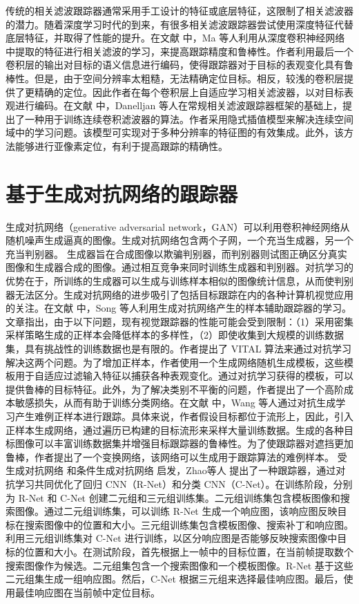 传统的相关滤波跟踪器通常采用手工设计的特征或底层特征，这限制了相关滤波器的潜力。随着深度学习时代的到来，有很多相关滤波跟踪器尝试使用深度特征代替底层特征，并取得了性能的提升。在文献 \cite{CF2} 中，Ma 等人利用从深度卷积神经网络中提取的特征进行相关滤波的学习，来提高跟踪精度和鲁棒性。作者利用最后一个卷积层的输出对目标的语义信息进行编码，使得跟踪器对于目标的表观变化具有鲁棒性。但是，由于空间分辨率太粗糙，无法精确定位目标。相反，较浅的卷积层提供了更精确的定位。因此作者在每个卷积层上自适应学习相关滤波器，以对目标表观进行编码。在文献 \cite{danelljan2016beyond} 中，Danelljan 等人在常规相关滤波跟踪器框架的基础上，提出了一种用于训练连续卷积滤波器的算法。作者采用隐式插值模型来解决连续空间域中的学习问题。该模型可实现对于多种分辨率的特征图的有效集成。此外，该方法能够进行亚像素定位，有利于提高跟踪的精确性。
\section{基于生成对抗网络的跟踪器}
生成对抗网络（generative adversarial network，GAN）可以利用卷积神经网络从随机噪声生成逼真的图像。生成对抗网络包含两个子网，一个充当生成器，另一个充当判别器。 生成器旨在合成图像以欺骗判别器，而判别器则试图正确区分真实图像和生成器合成的图像。通过相互竞争来同时训练生成器和判别器。对抗学习的优势在于，所训练的生成器可以生成与训练样本相似的图像统计信息，从而使判别器无法区分。生成对抗网络的进步吸引了包括目标跟踪在内的各种计算机视觉应用的关注。在文献 \cite{VITAL} 中，Song 等人利用生成对抗网络产生的样本辅助跟踪器的学习。文章指出，由于以下问题，现有视觉跟踪器的性能可能会受到限制：（1）采用密集采样策略生成的正样本会降低样本的多样性，（2）即使收集到大规模的训练数据集，具有挑战性的训练数据也是有限的。作者提出了 VITAL 算法来通过对抗学习解决这两个问题。为了增加正样本，作者使用一个生成网络随机生成模板，这些模板用于自适应过滤输入特征以捕获各种表观变化。通过对抗学习获得的模板，可以提供鲁棒的目标特征。此外，为了解决类别不平衡的问题，作者提出了一个高阶成本敏感损失，从而有助于训练分类网络。在文献 \cite{SINT++} 中，Wang 等人通过对抗生成学习产生难例正样本进行跟踪。具体来说，作者假设目标都位于流形上，因此，引入正样本生成网络，通过遍历已构建的目标流形来采样大量训练数据。生成的各种目标图像可以丰富训练数据集并增强目标跟踪器的鲁棒性。为了使跟踪器对遮挡更加鲁棒，作者提出了一个变换网络，该网络可以生成用于跟踪算法的难例样本。%
受生成对抗网络 \cite{GAN} 和条件生成对抗网络 \cite{cGAN} 启发，Zhao等人 \cite{AdversarialDeep} 提出了一种跟踪器，通过对抗学习共同优化了回归 CNN（R-Net）和分类 CNN（C-Net）。在训练阶段，分别为 R-Net 和 C-Net 创建二元组和三元组训练集。二元组训练集包含模板图像和搜索图像。通过二元组训练集，可以训练 R-Net 生成一个响应图，该响应图反映目标在搜索图像中的位置和大小。三元组训练集包含模板图像、搜索补丁和响应图。利用三元组训练集对 C-Net 进行训练，以区分响应图是否能够反映搜索图像中目标的位置和大小。在测试阶段，首先根据上一帧中的目标位置，在当前帧提取数个搜索图像作为候选。二元组集包含一个搜索图像和一个模板图像。R-Net 基于这些二元组集生成一组响应图。然后，C-Net 根据三元组来选择最佳响应图。最后，使用最佳响应图在当前帧中定位目标。%

